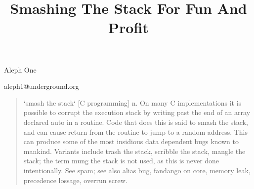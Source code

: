 \documentclass[12pt]{article}
\title{Smashing The Stack For Fun And Profit}
\begin{document}
\maketitle

%

\newpage
\tableofcontents
\newpage

\begin{comment}
.oO Phrack 49 Oo.

Volume Seven, Issue Forty Nine File 14 of 16

BugTraq, r00t, and Underground.Org

 bring you

\end{comment}

\begin{center}
Aleph One

aleph1@underground.org
\end{center}
\begin{quote}

`smash the stack` [C programming] n. On many C implementations it is possible to corrupt the 
execution stack by writing past the end of an array declared auto in a routine. Code that does this is 
said to smash the stack, and can cause return from the routine to jump to a random address. This 
can produce some of the most insidious data dependent bugs known to mankind. Variants include 
trash the stack, scribble the stack, mangle the stack; the term mung the stack is not used, as this is 
never done intentionally. See spam; see also alias bug, fandango on core,  memory leak, precedence 
lossage, overrun screw.
\end{quote}
\end{document}
